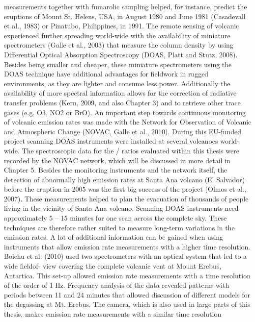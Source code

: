 \documentclass  [
  paper    = a4,
  BCOR     = 10mm,
  twoside,
  fontsize = 12pt,
  fleqn,
  toc      = bibnumbered,
  toc      = listofnumbered,
  numbers  = noendperiod,
  headings = normal,
  listof   = leveldown,
  version  = 3.03
]                                       {scrreprt}
\begin{document}
{	measurements together with fumarolic sampling helped, for instance, predict the
	eruptions of Mount St. Helens, USA, in August 1980 and June 1981 (Casadevall
	et al., 1983) or Pinatubo, Philippines, in 1991. The remote sensing of volcanic
	 experienced further spreading world-wide with the availability of miniature
	spectrometers (Galle et al., 2003) that measure the  column density by
	using Differential Optical Absorption Spectroscopy (DOAS, Platt and Stutz,
	2008). Besides being smaller and cheaper, these miniature spectrometers using
	the DOAS technique have additional advantages for fieldwork in rugged
	environments, as they are lighter and consume less power. Additionally the
	availability of more spectral information allows for the correction of radiative
	transfer problems (Kern, 2009, and also Chapter 3) and to retrieve other trace
	gases (e.g. O3, NO2 or BrO). An important step towards continuous monitoring
	of volcanic  emission rates was made with the Network for Observation
	of Volcanic and Atmospheric Change (NOVAC, Galle et al., 2010). During
	this EU-funded project scanning DOAS instruments were installed at several
	volcanoes world-wide. The spectroscopic data for the / ratios evaluated
	within this thesis were recorded by the NOVAC network, which will be discussed
	in more detail in Chapter 5. Besides the monitoring instruments and the network
	itself, the detection of abnormally high  emission rates at Santa Ana volcano
	(El Salvador) before the eruption in 2005 was the first big success of the project
	(Olmos et al., 2007). These measurements helped to plan the evacuation of
	thousands of people living in the vicinity of Santa Ana volcano. Scanning DOAS
	instruments need approximately 5 – 15 minutes for one scan across the complete
	sky. These techniques are therefore rather suited to measure long-term variations
	in the  emission rates.
	A lot of additional information can be gained when using instruments that
	allow emission rate measurements with a higher time resolution. Boichu et al.
	(2010) used two spectrometers with an optical system that led to a wide fieldof-
	view covering the complete volcanic vent at Mount Erebus, Antartica. This
	set-up allowed  emission rate measurements with a time resolution of the
	order of 1 Hz. Frequency analysis of the data revealed patterns with periods
	between 11 and 24 minutes that allowed discussion of different models for the
	degassing at Mt. Erebus. The  camera, which is also used in large parts of
	this thesis, makes  emission rate measurements with a similar time resolution
}
\end{document}
